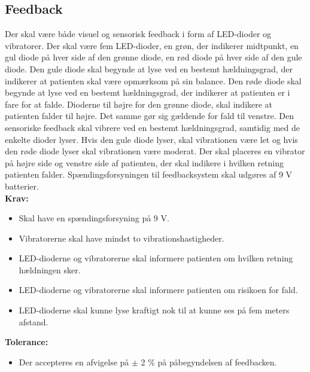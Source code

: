 \subsection{Feedback}
Der skal være både visuel og sensorisk feedback i form af LED-dioder og vibratorer. Der skal være fem LED-dioder, en grøn, der indikerer midtpunkt, en gul diode på hver side af den grønne diode, en rød diode på hver side af den gule diode. Den gule diode skal begynde at lyse ved en bestemt hældningsgrad, der indikerer at patienten skal være opmærksom på sin balance. Den røde diode skal begynde at lyse ved en bestemt hældningsgrad, der indikerer at patienten er i fare for at falde. Dioderne til højre for den grønne diode, skal indikere at patienten falder til højre. Det samme gør sig gældende for fald til venstre. Den sensoriske feedback skal vibrere ved en bestemt hældningsgrad, samtidig med de enkelte dioder lyser. Hvis den gule diode lyser, skal vibrationen være let og hvis den røde diode lyser skal vibrationen være moderat. Der skal placeres en vibrator på højre side og venstre side af patienten, der skal indikere i hvilken retning patienten falder. Spændingsforsyningen til feedbacksystem skal udgøres af 9 V batterier. \\
\textbf{Krav:}
\begin{itemize}
\item Skal have en spændingsforsyning på 9 V.
\item Vibratorerne skal have mindst to vibrationshastigheder.
\item LED-dioderne og vibratorerne skal informere patienten om hvilken retning hældningen sker.
\item LED-dioderne og vibratorerne skal informere patienten om risikoen for fald.
\item LED-dioderne skal kunne lyse kraftigt nok til at kunne ses på fem meters afstand.
\end{itemize}
\textbf{Tolerance:}
\begin{itemize}
\item Der accepteres en afvigelse på $\pm$ 2 \% på påbegyndelsen af feedbacken.
\end{itemize}
